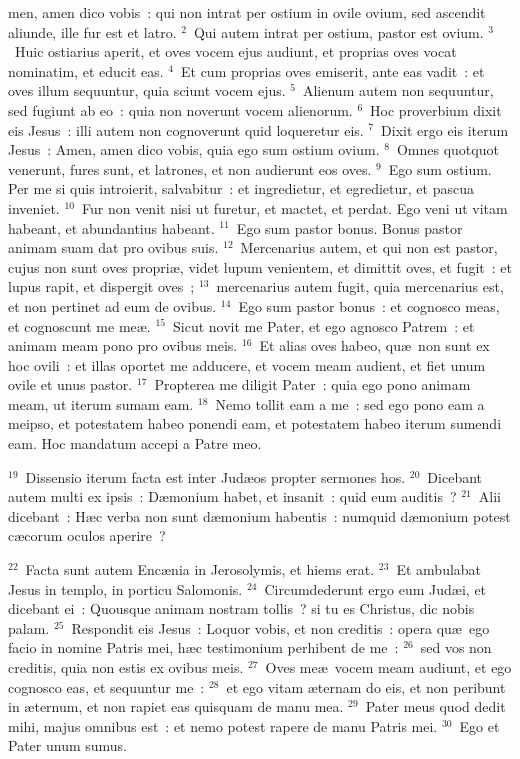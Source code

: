 \bchapter
{}men, amen dico vobis~: qui non intrat per ostium in ovile ovium, sed ascendit aliunde, ille fur est et latro.
${}^{2}$~Qui autem intrat per ostium, pastor est ovium.
${}^{3}$~Huic ostiarius aperit, et oves vocem ejus audiunt, et proprias oves vocat nominatim, et educit eas.
${}^{4}$~Et cum proprias oves emiserit, ante eas vadit~: et oves illum sequuntur, quia sciunt vocem ejus.
${}^{5}$~Alienum autem non sequuntur, sed fugiunt ab eo~: quia non noverunt vocem alienorum.
${}^{6}$~Hoc proverbium dixit eis Jesus~: illi autem non cognoverunt quid loqueretur eis.
${}^{7}$~Dixit ergo eis iterum Jesus~: Amen, amen dico vobis, quia ego sum ostium ovium.
${}^{8}$~Omnes quotquot venerunt, fures sunt, et latrones, et non audierunt eos oves.
${}^{9}$~Ego sum ostium. Per me si quis introierit, salvabitur~: et ingredietur, et egredietur, et pascua inveniet.
${}^{10}$~Fur non venit nisi ut furetur, et mactet, et perdat. Ego veni ut vitam habeant, et abundantius habeant.
${}^{11}$~Ego sum pastor bonus. Bonus pastor animam suam dat pro ovibus suis.
${}^{12}$~Mercenarius autem, et qui non est pastor, cujus non sunt oves propri\ae , videt lupum venientem, et dimittit oves, et fugit~: et lupus rapit, et dispergit oves~;
${}^{13}$~mercenarius autem fugit, quia mercenarius est, et non pertinet ad eum de ovibus.
${}^{14}$~Ego sum pastor bonus~: et cognosco meas, et cognoscunt me me\ae .
${}^{15}$~Sicut novit me Pater, et ego agnosco Patrem~: et animam meam pono pro ovibus meis.
${}^{16}$~Et alias oves habeo, qu\ae\ non sunt ex hoc ovili~: et illas oportet me adducere, et vocem meam audient, et fiet unum ovile et unus pastor.
${}^{17}$~Propterea me diligit Pater~: quia ego pono animam meam, ut iterum sumam eam.
${}^{18}$~Nemo tollit eam a me~: sed ego pono eam a meipso, et potestatem habeo ponendi eam, et potestatem habeo iterum sumendi eam. Hoc mandatum accepi a Patre meo.


${}^{19}$~Dissensio iterum facta est inter Jud\ae os propter sermones hos.
${}^{20}$~Dicebant autem multi ex ipsis~: D\ae monium habet, et insanit~: quid eum auditis~?
${}^{21}$~Alii dicebant~: H\ae c verba non sunt d\ae monium habentis~: numquid d\ae monium potest c\ae corum oculos aperire~?


${}^{22}$~Facta sunt autem Enc\ae nia in Jerosolymis, et hiems erat.
${}^{23}$~Et ambulabat Jesus in templo, in porticu Salomonis.
${}^{24}$~Circumdederunt ergo eum Jud\ae i, et dicebant ei~: Quousque animam nostram tollis~? si tu es Christus, dic nobis palam.
${}^{25}$~Respondit eis Jesus~: Loquor vobis, et non creditis~: opera qu\ae\ ego facio in nomine Patris mei, h\ae c testimonium perhibent de me~:
${}^{26}$~sed vos non creditis, quia non estis ex ovibus meis.
${}^{27}$~Oves me\ae\ vocem meam audiunt, et ego cognosco eas, et sequuntur me~:
${}^{28}$~et ego vitam \ae ternam do eis, et non peribunt in \ae ternum, et non rapiet eas quisquam de manu mea.
${}^{29}$~Pater meus quod dedit mihi, majus omnibus est~: et nemo potest rapere de manu Patris mei.
${}^{30}$~Ego et Pater unum sumus.


